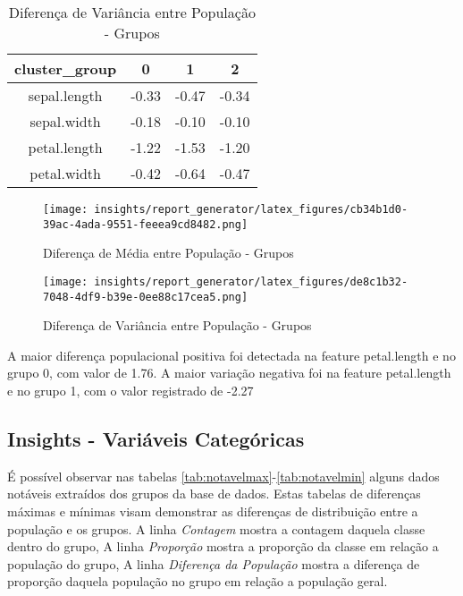 \documentclass{article}%
\begin{document}
%


\begin{table}[htbp]%
\caption{Diferença de Variância entre População {-} Grupos}%
\centering%
\begin{tabular}{cccc}
\toprule
cluster\_group &     0 &     1 &     2 \\
\midrule
sepal.length & -0.33 & -0.47 & -0.34 \\
sepal.width  & -0.18 & -0.10 & -0.10 \\
petal.length & -1.22 & -1.53 & -1.20 \\
petal.width  & -0.42 & -0.64 & -0.47 \\
\bottomrule
\end{tabular}
%
\label{tab:var}%
\end{table}

%


\begin{figure}%
\centering%
\texttt{[image: insights/report\_generator/latex\_figures/cb34b1d0-39ac-4ada-9551-feeea9cd8482.png]}%
\caption{Diferença de Média entre População {-} Grupos}%
\label{fig:media}%
\end{figure}

%


\begin{figure}%
\centering%
\texttt{[image: insights/report\_generator/latex\_figures/de8c1b32-7048-4df9-b39e-0ee88c17cea5.png]}%
\caption{Diferença de Variância entre População {-} Grupos}%
\label{fig:var}%
\end{figure}

%
A maior diferença populacional positiva foi detectada na feature petal.length e no grupo 0, com valor de 1.76. A maior variação negativa foi na feature petal.length e no grupo 1, com o valor registrado de {-}2.27\newline%
%
\newline

%
\subsection{Insights {-} Variáveis Categóricas}%
\label{subsec:Insights{-}VariveisCategricas}%
É possível observar nas tabelas \ref{tab:notavelmax}-\ref{tab:notavelmin} alguns dados notáveis extraídos dos grupos da base de dados. Estas tabelas de diferenças máximas e mínimas visam demonstrar as diferenças de distribuição entre a população e os grupos. A linha \textit{Contagem} mostra a contagem daquela classe dentro do grupo, A linha \textit{Proporção} mostra a proporção da classe em relação a população do grupo, A linha \textit{Diferença da População} mostra a diferença de proporção daquela população no grupo em relação a população geral. %
\newline%
\end{document}
